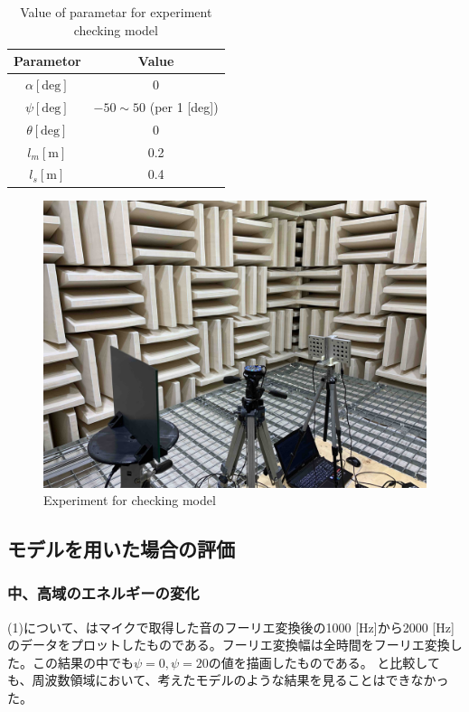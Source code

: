 \begin{table}[ht]
    \centering
    \caption{Value of parametar for experiment checking model}
    \begin{tabular}{c|c}\hline
        Parametor & Value \\ \hline\hline
        $\alpha [\mathrm{deg}]$ & 0 \\ \hline
        $\psi [\mathrm{deg}]$ & $-50 \sim 50$ (per 1 [deg])\\ \hline
        $\theta [\mathrm{deg}]$ & 0 \\ \hline
        $l_m [\mathrm{m}]$ & 0.2 \\ \hline
        $l_s [\mathrm{m}]$ & 0.4 \\ \hline
    \end{tabular}
    \label{tab:exp_para}
\end{table}

\begin{figure}[ht]
  \begin{center}
  \vspace{1zh}
    \includegraphics[width=0.6\linewidth]{images/3_exp_anechoic.jpg}  
  \end{center}
  \caption{Experiment for checking model}
  \label{fig:exp_env}
\end{figure}

\subsection{モデルを用いた場合の評価}
\label{sec:result_model}
\subsubsection{中、高域のエネルギーの変化}
(1)について、はマイクで取得した音のフーリエ変換後の1000 [Hz]から2000 [Hz]のデータをプロットしたものである。フーリエ変換幅は全時間をフーリエ変換した。この結果の中でも$\psi=0, \psi=20$の値を描画したものである。
と比較しても、周波数領域において、考えたモデルのような結果を見ることはできなかった。



